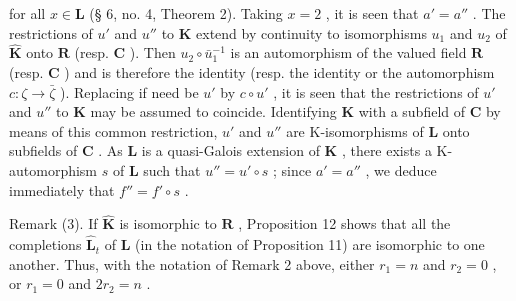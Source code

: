 for all \(x \in \mathbf{L}\) (§ 6, no. 4, Theorem 2). Taking \(x = 2\) , it is seen that \(a' = a''\) . The restrictions of \(u'\) and \(u''\) to \(\mathbf{K}\) extend by continuity to isomorphisms \(u_1\) and \(u_2\) of \(\hat{\mathbf{K}}\) onto \(\mathbf{R}\) (resp. \(\mathbf{C}\) ). Then \(u_2 \circ \bar{u}_1^{-1}\) is an automorphism of the valued field \(\mathbf{R}\) (resp. \(\mathbf{C}\) ) and is therefore the identity (resp. the identity or the automorphism \(c: \zeta \to \bar{\zeta}\) ). Replacing if need be \(u'\) by \(c \circ u'\) , it is seen that the restrictions of \(u'\) and \(u''\) to \(\mathbf{K}\) may be assumed to coincide. Identifying \(\mathbf{K}\) with a subfield of \(\mathbf{C}\) by means of this common restriction, \(u'\) and \(u''\) are K-isomorphisms of \(\mathbf{L}\) onto subfields of \(\mathbf{C}\) . As \(\mathbf{L}\) is a quasi-Galois extension of \(\mathbf{K}\) , there exists a K-automorphism \(s\) of \(\mathbf{L}\) such that \(u'' = u' \circ s\) ; since \(a' = a''\) , we deduce immediately that \(f'' = f' \circ s\) .

Remark (3). If \(\hat{\mathbf{K}}\) is isomorphic to \(\mathbf{R}\) , Proposition 12 shows that all the completions \(\hat{\mathbf{L}}_t\) of \(\mathbf{L}\) (in the notation of Proposition 11) are isomorphic to one another. Thus, with the notation of Remark 2 above, either \(r_1 = n\) and \(r_2 = 0\) , or \(r_1 = 0\) and \(2r_2 = n\) .

